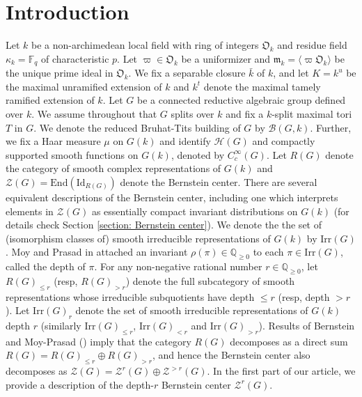 \documentclass[11 pt]{article}
\numberwithin{equation}{subsection}
\theoremstyle{definition}
\theoremstyle{remark}
\theoremstyle{conjecture}
\newcommand{\Irr}{\mathrm{Irr}}
\newcommand{\Q}{\mathbb Q}
\newcommand{\HH}{\mathcal H}
\newcommand{\F}{\mathbb F}
\newcommand{\mf}{\mathfrak}
\newcommand{\B}{\mathcal{B}}
\newcommand{\ZZ}{\mathcal{Z}}
\begin{document}
\section{Introduction}
Let $k$ be a non-archimedean local field with ring of integers $\mf O_k$ and residue field $\kappa_k=\F_q$ of characteristic $p$. Let $\varpi \in \mf O_k$ be a uniformizer and $\mf m_k=\langle\varpi \mf O_k\rangle$ be the unique prime ideal in $\mf O_k$. We fix a separable closure $\bar{k}$ of $k$, and let $K=k^u$ be the maximal unramified extension of $k$ and $k^t$ denote the maximal tamely ramified extension of $k$. 
Let $G$ be a connected reductive algebraic group defined over $k$. We assume throughout that $G$ splits over $k$ and fix a $k$-split maximal tori $T$ in $G$. We denote the reduced Bruhat-Tits building of $G$ by $\B(G,k)$. Further, we fix a Haar measure $\mu$ on $G(k)$ and identify $\HH(G)$ and compactly supported smooth functions on $G(k)$, denoted by $C^\infty_c(G)$. Let $R(G)$ denote the category of smooth complex representations of $G(k)$ and $\mathcal{Z}(G)=\mathrm{End}(\mathrm{Id}_{R(G)})$ denote the Bernstein center. There are several equivalent descriptions of the Bernstein center, including one which interprets elements in $\ZZ(G)$ as essentially compact invariant distributions on $G(k)$ (for details check Section \ref{section: Bernstein center}). We denote the the set of (isomorphism classes of) smooth irreducible representations of $G(k)$ by $\Irr(G)$. Moy and Prasad in \cite{MP94} attached an invariant $\rho(\pi)\in \Q_{\geq 0}$ to each $\pi \in \Irr(G)$, called the depth of $\pi$. For any non-negative rational number $r\in\mathbb Q_{\geq 0}$,
let $R(G)_{\leq r}$ (resp, $R(G)_{> r}$) denote the full subcategory of smooth representations whose irreducible subquotients have depth $\leq r $ (resp, depth $>r$). Let $\Irr(G)_r$ denote the set of smooth irreducible representations of $G(k)$ depth $r$ (similarly $\Irr(G)_{\leq r}$, $\Irr(G)_{<r}$ and $\Irr(G)_{>r}$). Results of Bernstein and Moy-Prasad (\cite{Ber, MP94, MP96}) imply that the category $R(G)$ decomposes as a direct sum
 $R(G) = R(G)_{\leq r} \oplus R(G)_{> r}$, and hence the Bernstein center also decomposes as $\ZZ(G) = \ZZ^r(G) \oplus \ZZ^{>r}(G)$. In the first part of our article, we provide a description of the depth-$r$ Bernstein center $\ZZ^r(G)$. \par
\end{document}
